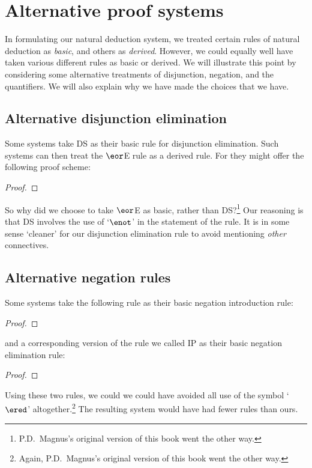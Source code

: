 
\chapter{Alternative proof systems}
In formulating our natural deduction system, we treated certain rules of natural deduction as \emph{basic}, and others as \emph{derived}. However, we could equally well have taken various different rules as basic or derived. We will illustrate this point by considering some alternative treatments of disjunction, negation, and the quantifiers. We will also explain why we have made the choices that we have.


\section{Alternative disjunction elimination}
Some systems take DS as their basic rule for disjunction elimination. Such systems can then treat the $\eor$E rule as a derived rule. For they might offer the following proof scheme: 
\begin{proof}
  \open
     {}
  \close
  \open
  \close
  \open
    \open
    \close
  \close
\end{proof}
So why did we choose to take $\eor$E as basic, rather than DS?\footnote{P.D.\ Magnus's original version of this book went the other way.} Our reasoning is that DS involves the use of `$\enot$' in the statement of the rule. It is in some sense `cleaner' for our disjunction elimination rule to avoid mentioning \emph{other} connectives. 


\section{Alternative negation rules}
Some systems take the following rule as their basic negation introduction rule:
\begin{proof}
	\open
	\close
\end{proof}
and a corresponding version of the rule we called IP as their basic negation elimination rule:
\begin{proof}
	\open
	\close
\end{proof}
Using these two rules, we could we could have avoided all use of the symbol `$\ered$' altogether.\footnote{Again, P.D.\ Magnus's original version of this book went the other way.} The resulting system would have had fewer rules than ours.

